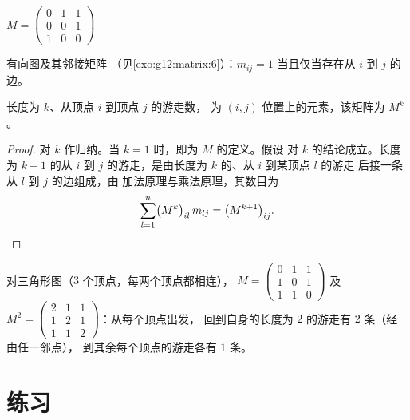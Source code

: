\begin{omfigure}
\qquad\qquad
$M = \begin{pmatrix} 0 & 1 & 1\\ 0 & 0 & 1\\ 1 & 0 & 0 \end{pmatrix}$

{\small 有向图及其邻接矩阵
（见\cref{exo:g12:matrix:6}）：$m_{ij} = 1$ 当且仅当存在从 $i$ 到
$j$ 的边。}
\end{omfigure}

\begin{theorem}[游走计数]\label{thm:g12:matrix:walks}
长度为 $k$、从顶点 $i$ 到顶点 $j$ 的游走数，
为 $(i,j)$ 位置上的元素，该矩阵为 $M^k$。
\end{theorem}

\begin{proof}
对 $k$ 作归纳。当 $k = 1$ 时，即为 $M$ 的定义。假设
对 $k$ 的结论成立。长度为 $k+1$ 的从 $i$ 到 $j$ 的游走，是由长度为 $k$ 的、从 $i$ 到某顶点 $l$ 的游走
后接一条从 $l$ 到 $j$ 的边组成，由
加法原理与乘法原理，其数目为
\[
\sum_{l=1}^{n} \bigl(M^k\bigr)_{il}\, m_{lj} = \bigl(M^{k+1}\bigr)_{ij}.
\qedhere
\]
\end{proof}

\begin{example}
对三角形图（$3$ 个顶点，每两个顶点都相连），
$M = \begin{pmatrix} 0&1&1\\ 1&0&1\\ 1&1&0\end{pmatrix}$ 及
$M^2 = \begin{pmatrix} 2&1&1\\ 1&2&1\\ 1&1&2\end{pmatrix}$：从每个顶点出发，
回到自身的长度为 $2$ 的游走有 $2$ 条（经由任一邻点），
到其余每个顶点的游走各有 $1$ 条。
\end{example}

\section{练习}


